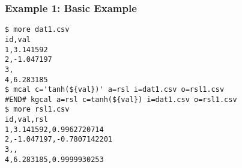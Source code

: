 \subsubsection*{Example 1: Basic Example}



\begin{Verbatim}[baselinestretch=0.7,frame=single]
$ more dat1.csv
id,val
1,3.141592
2,-1.047197
3,
4,6.283185
$ mcal c='tanh(${val})' a=rsl i=dat1.csv o=rsl1.csv
#END# kgcal a=rsl c=tanh(${val}) i=dat1.csv o=rsl1.csv
$ more rsl1.csv
id,val,rsl
1,3.141592,0.9962720714
2,-1.047197,-0.7807142201
3,,
4,6.283185,0.9999930253
\end{Verbatim}
